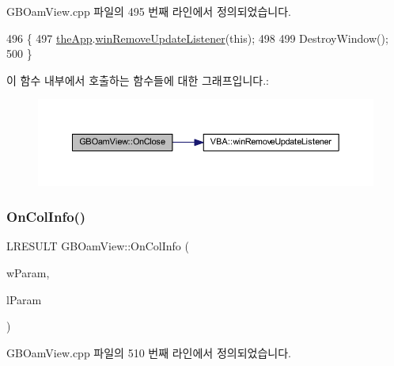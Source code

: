 G\+B\+Oam\+View.\+cpp 파일의 495 번째 라인에서 정의되었습니다.


\begin{DoxyCode}
496 \{
497   \mbox{\hyperlink{_v_b_a_8cpp_a8095a9d06b37a7efe3723f3218ad8fb3}{theApp}}.\mbox{\hyperlink{class_v_b_a_a2d31a0656df2230310aa8dc9e3a735d3}{winRemoveUpdateListener}}(\textcolor{keyword}{this});
498   
499   DestroyWindow();
500 \}
\end{DoxyCode}
이 함수 내부에서 호출하는 함수들에 대한 그래프입니다.\+:
\nopagebreak
\begin{figure}[H]
\begin{center}
\leavevmode
\includegraphics[width=350pt]{class_g_b_oam_view_a09793b8c72f602f1e30b802552c13ee3_cgraph}
\end{center}
\end{figure}
\mbox{\label{class_g_b_oam_view_a3b0623e23cfd8b04d576baed34f4d12d}} 
\subsubsection{\texorpdfstring{On\+Col\+Info()}{OnColInfo()}}
{\footnotesize\ttfamily L\+R\+E\+S\+U\+LT G\+B\+Oam\+View\+::\+On\+Col\+Info (\begin{DoxyParamCaption}\item[{W\+P\+A\+R\+AM}]{w\+Param,  }\item[{L\+P\+A\+R\+AM}]{l\+Param }\end{DoxyParamCaption})}



G\+B\+Oam\+View.\+cpp 파일의 510 번째 라인에서 정의되었습니다.


